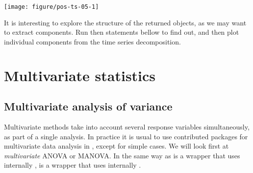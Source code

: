 \documentclass[krantz2]{krantz}\usepackage{knitr}%
\begin{document}
\begin{knitrout}\footnotesize
{}\color{fgcolor}\begin{kframe}
\begin{alltt}
 \hlkwb{<-}   \hlstd{=} \hlstd{)}
\end{alltt}
\end{kframe}

{\centering \texttt{[image: figure/pos-ts-05-1]} 

}



\end{knitrout}

\begin{advplayground}
It is interesting to explore the structure of the returned objects, as we may want to extract components. Run then statements bellow to find out, and then plot individual components from the time series decomposition.

\begin{knitrout}\footnotesize
{}\color{fgcolor}\begin{kframe}
\begin{alltt}
\end{alltt}
\end{kframe}
\end{knitrout}
\end{advplayground}


\section{Multivariate statistics}\label{sec:stat:MV}

\subsection{Multivariate analysis of variance}
Multivariate methods take into account several response variables simultaneously, as part of a single analysis. In practice it is usual to use contributed packages for multivariate data analysis in \Rlang, except for simple cases. We will look first at \emph{multivariate} ANOVA or MANOVA. In the same way as  is a wrapper that uses internally ,  is a wrapper that uses internally .
\end{document}
